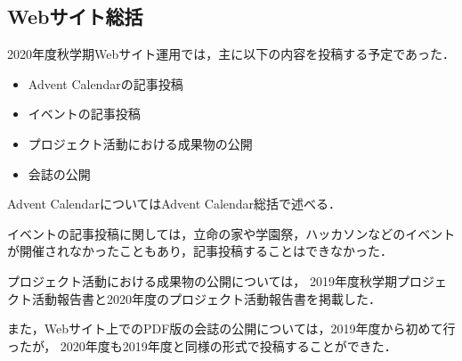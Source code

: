 \subsection*{Webサイト総括}



2020年度秋学期Webサイト運用では，主に以下の内容を投稿する予定であった．

\begin{itemize}
  \item Advent Calendarの記事投稿
  \item イベントの記事投稿
  \item プロジェクト活動における成果物の公開
  \item 会誌の公開
\end{itemize}

Advent CalendarについてはAdvent Calendar総括で述べる．

イベントの記事投稿に関しては，立命の家や学園祭，ハッカソンなどのイベントが開催されなかったこともあり，記事投稿することはできなかった．

プロジェクト活動における成果物の公開については，
2019年度秋学期プロジェクト活動報告書と2020年度のプロジェクト活動報告書を掲載した．

また，Webサイト上でのPDF版の会誌の公開については，2019年度から初めて行ったが，
2020年度も2019年度と同様の形式で投稿することができた．
